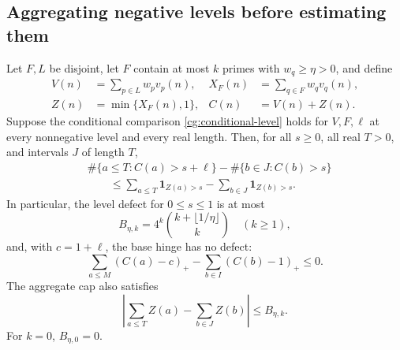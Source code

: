 \subsection{Aggregating negative levels before estimating them}

\begin{lemma}
\label{lem:cg-level-defect}
Let \(F,L\) be disjoint, let \(F\) contain at most \(k\) primes with
\(w_q\ge\eta>0\), and define
\[
 \begin{aligned}
 V(n)&=\sum_{p\in L}w_pv_p(n),&
 X_F(n)&=\sum_{q\in F}w_qv_q(n),\\
 Z(n)&=\min\{X_F(n),1\},& C(n)&=V(n)+Z(n).
 \end{aligned}
\]
Suppose the conditional comparison \eqref{cg:conditional-level}
holds for \(V,F,\ell\) at every nonnegative level and every real
length. Then, for all \(s\ge0\), all real \(T>0\), and intervals
\(J\) of length \(T\),
\begin{equation}
 \begin{split}
 &\#\{a\le T:C(a)>s+\ell\}-\#\{b\in J:C(b)>s\}\\
 &\qquad\le
 \sum_{a\le T}\mathbf1_{Z(a)>s}
       -\sum_{b\in J}\mathbf1_{Z(b)>s}.
 \end{split}
 \label{cg:aggregate-defect}
\end{equation}
In particular, the level defect for \(0\le s\le1\) is at most
\[
 B_{\eta,k}=4^k\binom{k+\lfloor1/\eta\rfloor}{k}
 \quad(k\ge1),
\]
and, with \(c=1+\ell\), the base hinge has no defect:
\begin{equation}
 \sum_{a\le M}(C(a)-c)_+-\sum_{b\in I}(C(b)-1)_+
 \le0.
 \label{cg:base-defect}
\end{equation}
The aggregate cap also satisfies
\begin{equation}
 \left|\sum_{a\le T}Z(a)-\sum_{b\in J}Z(b)\right|
 \le B_{\eta,k}.
 \label{cg:aggregate-cap-variation}
\end{equation}
For \(k=0\), \(B_{\eta,0}=0\).
\end{lemma}

